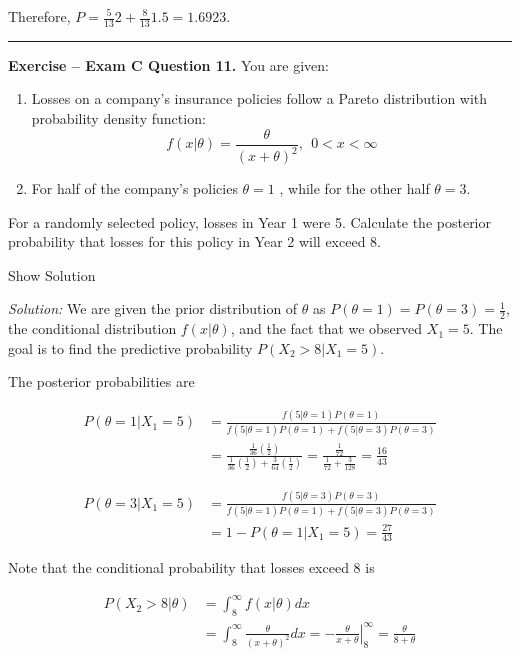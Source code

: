 \documentclass[]{book}
\providecommand{\tightlist}{%
  \setlength{\itemsep}{0pt}\setlength{\parskip}{0pt}}
\theoremstyle{definition}
\theoremstyle{definition}
\theoremstyle{definition}
\theoremstyle{remark}
\begin{document}
Therefore, \(P=\frac{5}{13}2 + \frac{8}{13}1.5 = 1.6923\).

\begin{center}\rule{0.5\linewidth}{\linethickness}\end{center}

\textbf{Exercise -- Exam C Question 11.} You are given:

\begin{enumerate}
\def\labelenumi{(\roman{enumi})}
\tightlist
\item
  Losses on a company's insurance policies follow a Pareto distribution
  with probability density function:
  \[f(x|\theta) = \frac{\theta}{(x+\theta)^2}, \ \ 0 < x < \infty\]
\item
  For half of the company's policies \(\theta=1\) , while for the other
  half \(\theta=3\).
\end{enumerate}

For a randomly selected policy, losses in Year 1 were 5. Calculate the
posterior probability that losses for this policy in Year 2 will exceed
8.

Show Solution

\hypertarget{toggleExamC11}{}
\emph{Solution:} We are given the prior distribution of \(\theta\) as
\(P(\theta=1)=P(\theta=3)=\frac{1}{2}\), the conditional distribution
\(f(x|\theta)\), and the fact that we observed \(X_1=5\). The goal is to
find the predictive probability \(P(X_2>8|X_1=5)\).

The posterior probabilities are

\[\begin{aligned}
P(\theta=1|X_1=5) &= \frac{f(5|\theta=1)P(\theta=1)}{f(5|\theta=1)P(\theta=1) + f(5|\theta=3)P(\theta=3)} \\
&= \frac{\frac{1}{36}(\frac{1}{2})}{\frac{1}{36}(\frac{1}{2})+\frac{3}{64}(\frac{1}{2})} = \frac{\frac{1}{72}}{\frac{1}{72} + \frac{3}{128}} = \frac{16}{43}
\end{aligned}\]

\[\begin{aligned}
P(\theta=3|X_1=5) &= \frac{f(5|\theta=3)P(\theta=3)}{f(5|\theta=1)P(\theta=1) + f(5|\theta=3)P(\theta=3)} \\
&= 1-P(\theta=1|X_1=5) = \frac{27}{43}
\end{aligned}\]

Note that the conditional probability that losses exceed 8 is

\[\begin{aligned}
P(X_2>8|\theta) &= \int_8^\infty f(x|\theta)dx \\
&= \int_8^\infty \frac{\theta}{(x+\theta)^2}dx = \left. -\frac{\theta}{x+\theta} \right|_8^\infty = \frac{\theta}{8 + \theta}
\end{aligned}\]
\end{document}
